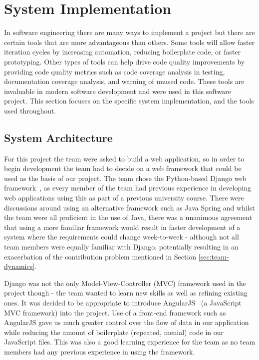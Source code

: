 \documentclass{l3proj}
\begin{document}
\section{System Implementation}
\label{sec:system-implementation}

In software engineering there are many ways to implement a project but there are certain tools that are more advantageous than others. Some tools will allow faster iteration cycles by increasing automation, reducing boilerplate code, or faster prototyping. Other types of tools can help drive code quality improvements by providing code quality metrics such as code coverage analysis in testing, documentation coverage analysis, and warning of unused code. These tools are invaluable in modern software development and were used in this software project. This section focuses on the specific system implementation, and the tools used throughout.

\subsection{System Architecture}
\label{sec:system-implementation:system-architecture}

For this project the team were asked to build a web application, so in order to begin development the team had to decide on a web framework that could be used as the basis of our project. The team chose the Python-based Django web framework~\cite{Django}, as every member of the team had previous experience in developing web applications using this as part of a previous university course. There were discussions around using an alternative framework such as Java Spring and whilst the team were all proficient in the use of Java, there was a unanimous agreement that using a more familiar framework would result in faster development of a system where the requirements could change week-to-week - although not all team members were equally familiar with Django, potentially resulting in an exacerbation of the contribution problem mentioned in Section \ref{sec:team-dynamics}.

Django was not the only Model-View-Controller (MVC) framework used in the project though - the team wanted to learn new skills as well as refining existing ones. It was decided to be appropriate to introduce AngularJS~\cite{AngularWebpage} (a JavaScript MVC framework) into the project. Use of a front-end framework such as AngularJS gave us much greater control over the flow of data in our application while reducing the amount of boilerplate (repeated, menial) code in our JavaScript files. This was also a good learning experience for the team as no team members had any previous experience in using the framework.
\end{document}
